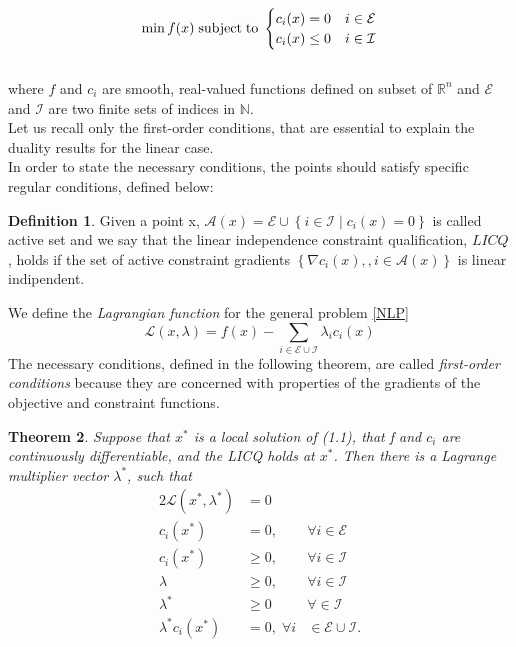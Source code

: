 \documentclass[a4paper,10 pt,titlepage,twoside]{book}
\theoremstyle{plain}
\newtheorem{thm}{Theorem}[chapter]
\theoremstyle{definition}
\newtheorem{defn}[thm]{Definition}
\theoremstyle{remark}
\begin{document}
\begin{equation}\label{NLP}
\min f(x)\text{\;subject\;to\;}\begin{cases} c_{i}(x) = 0 &i \in \mathcal{E}\\ c_{i}(x)\leq 0 &i\in \mathcal{I}\end{cases}
\end{equation}
\\
where $f$ and $c_{i}$ are smooth, real-valued functions defined on subset of $\mathbb{R}^{n}$ and $\mathcal{E}$ and $\mathcal{I}$ are two finite sets of indices in $\mathbb{N}$.\\Let us recall only the first-order conditions, that are essential to explain the duality results for the linear case.\\
In order to state the necessary conditions, the points should satisfy specific regular conditions, defined below:
\begin{defn}
	Given a point x, $\mathcal{A}(x)= \mathcal{E}\cup\left\lbrace i\in\mathcal{I}\;|\;c_{i}(x) =0\right\rbrace$ is called active set and we say that the linear independence constraint qualification, $LICQ$, holds if the set of active constraint gradients $\left\lbrace \nabla c_{i}(x),,i\in\mathcal{A}(x)\right\rbrace$ is linear indipendent.
\end{defn}
We define the \textit{Lagrangian function} for the general problem \ref{NLP} 
\begin{equation*}
\mathcal{L}\left(x,\lambda\right)=f(x)-\sum_{i\in\mathcal{E}\cup\mathcal{I}}\lambda_{i}c_{i}(x)
\end{equation*}
The necessary conditions, defined in the following theorem, are called \textit{first-order conditions} because they are concerned with properties of the gradients of the objective and constraint functions.
\begin{thm}
Suppose that $x^{*}$ is a local solution of (1.1), that f and $c_{i}$ are continuously differentiable, and the LICQ holds at $x^{*}$. Then there is a Lagrange multiplier vector $\lambda^{*}$, such that 
\begin{alignat*}{2}
\mathcal{L}(x^{*},\lambda^{*})&=0&\\
c_{i}(x^{*})&=0, &\forall i\in\mathcal{E}\\
c_{i}(x^{*})&\geq 0, &\forall i\in\mathcal{I}\\
\lambda&\geq 0, &\forall i\in\mathcal{I}\\
\lambda^{*} &\geq 0 & \forall \in\mathcal{I}\\
\lambda^{*}c_{i}(x^{*})&= 0,\;\forall i&\in\mathcal{E}\cup\mathcal{I}.\\
\end{alignat*} 
\end{thm}
\end{document}
